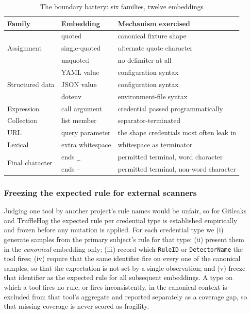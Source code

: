 \documentclass[journal]{IEEEtran}
\begin{document}
\begin{table}[t]
\centering
\caption{The boundary battery: six families, twelve embeddings}
\label{tab:taxonomy}
\small
\setlength{\tabcolsep}{3.5pt}
\begin{tabular}{@{}llp{3.25cm}@{}}
\toprule
Family & Embedding & Mechanism exercised \\
\midrule
\multirow{3}{*}{Assignment}
 & quoted & canonical fixture shape \\
 & single-quoted & alternate quote character \\
 & unquoted & no delimiter at all \\
\midrule
\multirow{3}{*}{Structured data}
 & YAML value & configuration syntax \\
 & JSON value & configuration syntax \\
 & dotenv & environment-file syntax \\
\midrule
Expression
 & call argument & credential passed programmatically \\
\midrule
Collection
 & list member & separator-terminated \\
\midrule
URL
 & query parameter & the shape credentials most often leak in \\
\midrule
Lexical
 & extra whitespace & whitespace as terminator \\
\midrule
\multirow{2}{*}{Final character}
 & ends \texttt{\_} & permitted terminal, word character \\
 & ends \texttt{-} & permitted terminal, non-word character \\
\bottomrule
\end{tabular}
\end{table}

\subsubsection*{Freezing the expected rule for external scanners}
\label{sec:freeze}

Judging one tool by another project's rule names would be unfair, so for Gitleaks and TruffleHog the expected rule per credential type is established empirically and frozen before any mutation is applied. For each credential type we (i) generate samples from the primary subject's rule for that type; (ii) present them in the \emph{canonical} embedding only; (iii) record which \texttt{RuleID} or \texttt{DetectorName} the tool fires; (iv) require that the same identifier fire on every one of the canonical samples, so that the expectation is not set by a single observation; and (v) freeze that identifier as the expected rule for all subsequent embeddings. A type on which a tool fires no rule, or fires inconsistently, in the canonical context is excluded from that tool's aggregate and reported separately as a coverage gap, so that missing coverage is never scored as fragility.
\end{document}
